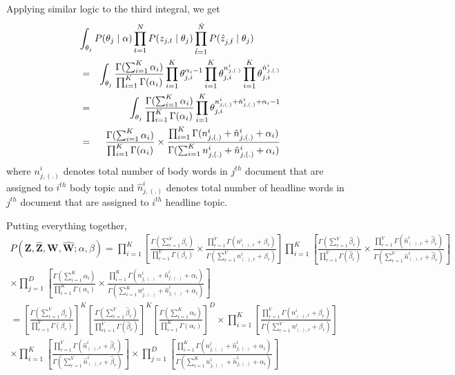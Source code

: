 \documentclass[a4paper]{article}
\begin{document}
Applying similar logic to the third integral, we get
\begin{eqnarray*}
\lefteqn{\int_{\theta_{j}} P(\theta_{j} \mid \alpha) \prod_{t=1}^{N}P(z_{j,t} \mid \theta_{j}) \prod_{\hat{t}=1}^{\hat{N}} P(\hat{z}_{j,\hat{t}} \mid \theta_{j})}\\
& = & \int_{\theta_{j}} \frac{\Gamma(\sum_{i=1}^{K} \alpha_{i})}{\prod_{i=1}^{K}\Gamma(\alpha_{i})} \prod_{i=1}^{K} \theta_{j,i}^{\alpha_{i} -1} \prod_{i=1}^{K} \theta_{j,i}^{n_{j,(.)}^{i}} \prod_{i=1}^{K} \theta_{j,i}^{\hat{n}_{j,(.)}^{i}} \\
& = & \int_{\theta_{j}} \frac{\Gamma(\sum_{i=1}^{K} \alpha_{i})}{\prod_{i=1}^{K}\Gamma(\alpha_{i})} \prod_{i=1}^{K} \theta_{j,i}^{ n_{j,(.)}^{i} + \hat{n}_{j,(.)}^{i} +  \alpha_{i} -1}\\
& = & \frac{\Gamma(\sum_{i=1}^{K} \alpha_{i})}{\prod_{i=1}^{K}\Gamma(\alpha_{i})} \times \frac{\prod_{i=1}^{K} \Gamma(n_{j,(.)}^{i} + \hat{n}_{j,(.)}^{i} +  \alpha_{i} )}{\Gamma(\sum_{i=1}^{K}n_{j,(.)}^{i} + \hat{n}_{j,(.)}^{i} +  \alpha_{i} )}
\end{eqnarray*}
where $n_{j,(.)}^{i}$ denotes total number of body words in $j^{th}$ document that are assigned to $i^{th}$ body topic and $\hat{n}_{j,(.)}^{i}$ denotes total number of headline words in $j^{th}$ document that are assigned to $i^{th}$ headline topic.

Putting everything together,
\begin{multline*}
P(\mathbf{Z}, \mathbf{\hat{Z}}, \mathbf{W}, \mathbf{\hat{W}} ; \alpha, \beta)
 = \prod_{i=1}^{K} \left[  \frac{\Gamma(\sum_{r=1}^{V} \beta_{r})}{\prod_{r=1}^{V}\Gamma(\beta_{r})} \times \frac{\prod_{r=1}^{V} \Gamma(n_{(.),r}^{i} + \beta_{r} )}{\Gamma(\sum_{r=1}^{V}n_{(.),r}^{i} + \beta_{r} )}\right] \prod_{i=1}^{K} \left[   \frac{\Gamma(\sum_{r=1}^{V} \hat{\beta}_{r})}{\prod_{r=1}^{V}\Gamma(\hat{\beta}_{r})} \times \frac{\prod_{r=1}^{V} \Gamma(\hat{n}_{(.),r}^{i} + \hat{\beta}_{r} )}{\Gamma(\sum_{r=1}^{V}\hat{n}_{(.),r}^{i} + \hat{\beta}_{r} )} \right] \\ 
\times \prod_{j=1}^{D} \left[   \frac{\Gamma(\sum_{i=1}^{K} \alpha_{i})}{\prod_{i=1}^{K}\Gamma(\alpha_{i})} \times \frac{\prod_{i=1}^{K} \Gamma(n_{j,(.)}^{i} + \hat{n}_{j,(.)}^{i} +  \alpha_{i} )}{\Gamma(\sum_{i=1}^{K}n_{j,(.)}^{i} + \hat{n}_{j,(.)}^{i} +  \alpha_{i} )} \right] \\
 =  \left[  \frac{\Gamma(\sum_{r=1}^{V} \beta_{r})}{\prod_{r=1}^{V}\Gamma(\beta_{r})} \right]^{K} \left[   \frac{\Gamma(\sum_{r=1}^{V} \hat{\beta}_{r})}{\prod_{r1=1}^{V}\Gamma(\hat{\beta}_{r})}  \right]^{K} 
\left[ \frac{\Gamma(\sum_{i=1}^{K} \alpha_{i})}{\prod_{i=1}^{K}\Gamma(\alpha_{i})} \right]^{D} \times \prod_{i=1}^{K} \left[ \frac{\prod_{r=1}^{V} \Gamma(n_{(.),r}^{i} + \beta_{r} )}{\Gamma(\sum_{r=1}^{V}n_{(.),r}^{i} + \beta_{r} )} \right] \\ \times \prod_{i=1}^{K} \left[ \frac{\prod_{r=1}^{V} \Gamma(\hat{n}_{(.),r}^{i} + \hat{\beta}_{r} )}{\Gamma(\sum_{r=1}^{V}\hat{n}_{(.),r}^{i} + \hat{\beta}_{r} )}  \right] \times \prod_{j=1}^{D} \left[  \frac{\prod_{i=1}^{K} \Gamma(n_{j,(.)}^{i} + \hat{n}_{j,(.)}^{i} +  \alpha_{i} )}{\Gamma(\sum_{i=1}^{K}n_{j,(.)}^{i} + \hat{n}_{j,(.)}^{i} +  \alpha_{i} )} \right]
\end{multline*}
\end{document}
